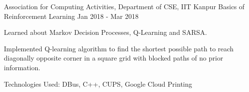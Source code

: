 \begin{cventries}
{  \cventry
  {Association for Computing Activities, Department of CSE, IIT Kanpur}
  {Basics of Reinforcement Learning}
  {}
  {Jan 2018 - Mar 2018}
  {
    \begin{cvitems}
      \item Learned about Markov Decision Processes, Q-Learning and SARSA.\vspace{1mm}
      \item Implemented Q-learning algorithm to find the shortest possible path to reach diagonally opposite corner in a square grid with blocked paths of no prior information.
        \vspace{1mm}
        \ifdefined \ONEPAGE \else
      \item Technologies Used: DBus, C++, CUPS, Google Cloud Printing
        \fi
    \end{cvitems}
  }
}
\end{cventries}

